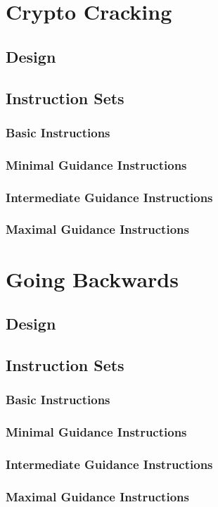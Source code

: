 \providecommand{\heading}[1]{\section{#1}}
\providecommand{\subheading}[1]{\subsection{#1}}

\heading{Crypto Cracking}\label{subsec:CTFs-cc}

    \subheading{Design}

    \subheading{Instruction Sets}\label{subsubsec:CTFs-cc-instructions}

        \subsubsection{Basic Instructions}

        \subsubsection{Minimal Guidance Instructions}

        \subsubsection{Intermediate Guidance Instructions}

        \subsubsection{Maximal Guidance Instructions}

\heading{Going Backwards}\label{subsec:CTFs-gb}

    \subheading{Design}

    \subheading{Instruction Sets}\label{subsubsec:CTFs-gb-instructions}

        \subsubsection{Basic Instructions}

        \subsubsection{Minimal Guidance Instructions}

        \subsubsection{Intermediate Guidance Instructions}

        \subsubsection{Maximal Guidance Instructions}